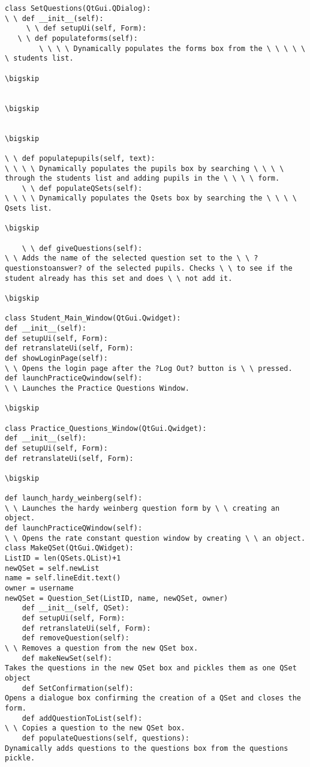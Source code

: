 \documentclass{article}
\begin{document}
\begin{verbatim}
class SetQuestions(QtGui.QDialog):
\ \ def __init__(self):
     \ \ def setupUi(self, Form):
   \ \ def populateforms(self):
        \ \ \ \ Dynamically populates the forms box from the \ \ \ \ \ \ students list.

\bigskip


\bigskip


\bigskip

\ \ def populatepupils(self, text):
\ \ \ \ Dynamically populates the pupils box by searching \ \ \ \ through the students list and adding pupils in the \ \ \ \ form.
    \ \ def populateQSets(self):
\ \ \ \ Dynamically populates the Qsets box by searching the \ \ \ \ Qsets list.

\bigskip

    \ \ def giveQuestions(self):
\ \ Adds the name of the selected question set to the \ \ ?questionstoanswer? of the selected pupils. Checks \ \ to see if the student already has this set and does \ \ not add it.

\bigskip

class Student_Main_Window(QtGui.Qwidget):
def __init__(self):
def setupUi(self, Form):
def retranslateUi(self, Form):
def showLoginPage(self):
\ \ Opens the login page after the ?Log Out? button is \ \ pressed.
def launchPracticeQwindow(self):
\ \ Launches the Practice Questions Window.

\bigskip

class Practice_Questions_Window(QtGui.Qwidget):
def __init__(self):
def setupUi(self, Form):
def retranslateUi(self, Form):

\bigskip

def launch_hardy_weinberg(self):
\ \ Launches the hardy weinberg question form by \ \ creating an object.
def launchPracticeQWindow(self):
\ \ Opens the rate constant question window by creating \ \ an object.
class MakeQSet(QtGui.QWidget):
ListID = len(QSets.QList)+1
newQSet = self.newList
name = self.lineEdit.text()
owner = username
newQSet = Question_Set(ListID, name, newQSet, owner)
    def __init__(self, QSet):     
    def setupUi(self, Form):
    def retranslateUi(self, Form):
    def removeQuestion(self):
\ \ Removes a question from the new QSet box.
    def makeNewSet(self):
Takes the questions in the new QSet box and pickles them as one QSet object
    def SetConfirmation(self):
Opens a dialogue box confirming the creation of a QSet and closes the form.      
    def addQuestionToList(self):
\ \ Copies a question to the new QSet box.
    def populateQuestions(self, questions):
Dynamically adds questions to the questions box from the questions pickle.


\end{verbatim}
\end{document}
